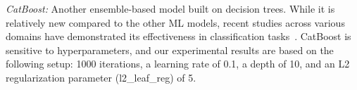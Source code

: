     \textit{CatBoost:} Another ensemble-based model built on decision
trees. While it is relatively new compared to the other ML
models, recent studies across various domains have demonstrated its
effectiveness in classification
tasks~\cite{CatBoost:NEURIPS2018}. %
CatBoost is sensitive to
hyperparameters, and our experimental results are based on the
following setup: 1000 iterations, a learning rate of 0.1, a depth of
10, and an L2 regularization parameter (l2\_leaf\_reg) of 5.

